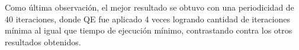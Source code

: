 Como última observación, el mejor resultado se obtuvo con una periodicidad de 40 iteraciones, donde QE fue aplicado 4 veces logrando cantidad de iteraciones mínima al igual que tiempo de ejecución mínimo, contrastando contra los otros resultados obtenidos.

\begin{comment}
\subsection{Relevancia de las p\'aginas}

La relevancia siguiente fue la dada por c = 0.5 (con los otros c cambiaban un poco el orden de las p\'aginas del medio, pero 
las de mayor y menor relevancia se manten\'an igual):

\begin{tabular}{ l | c }
  \hline
  www.ole.com.ar & 0.0676399\\	
  www.clarin.com & 0.0622717\\
  www.clasificados.clarin.com & 0.0507299\\
  www.ciudad.com.ar & 0.0507299\\
  www.lanacion.com.ar/ & 0.0474195\\
  canchallena.lanacion.com.ar & 0.0474195\\
  www.rollingstone.com.ar & 0.0442582\\
  www.zonaprop.com.ar & 0.0442582\\
  www.hotmail.com & 0.0440196\\
  www.youtube.com & 0.0426776\\
  www.clarin.com/deportes & 0.0362357\\
  www.twitter.com & 0.0355646\\
  www.google.com & 0.0284517\\
  www.infobae.com & 0.0284517\\
  www.mamapuntocero.com.ar & 0.0284517\\
  www.pagina12.com.ar & 0.0284517\\
  www.yahoo.com & 0.0284517\\
  www.taringa.net & 0.0284517\\
  www.mercadolibre.com.ar & 0.0284517\\
  www.netbeans.com & 0.0284517\\
  www.github.com & 0.0284517\\
  www.assembla.com & 0.0284517\\
  www.gmail.com & 0.0284517\\
  www.9gag.com & 0.0284517\\
  www.twitter.com & 0.0284517\\
  maps.google.com.ar & 0.0284517\\
  www.stackoverflow.com & 0.0284517\\
  \hline
\end{tabular}\newline



\end{comment}
